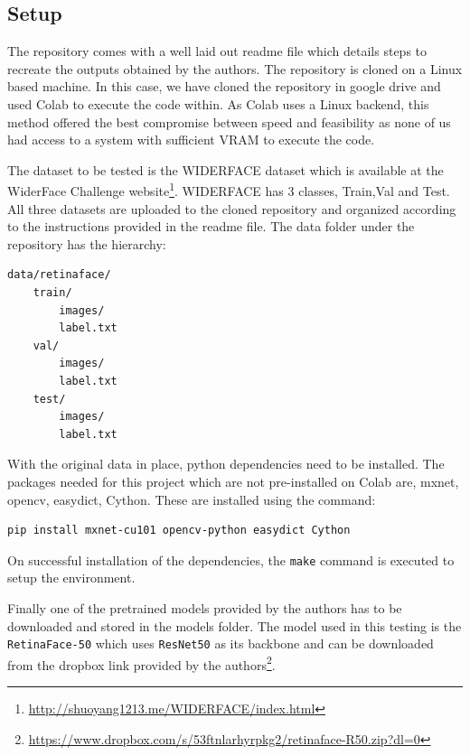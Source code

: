\documentclass{article}
\begin{document}
\subsection{Setup}
The repository comes with a well laid out readme file which details steps to recreate the outputs obtained by the authors. The repository is cloned on a Linux based machine. In this case, we have cloned the repository in google drive and used Colab to execute the code within. As Colab uses a Linux backend, this method offered the best compromise between speed and feasibility as none of us had access to a system with sufficient VRAM to execute the code. 

The dataset to be tested is the WIDERFACE dataset which is available at the WiderFace Challenge website\footnote{\url{http://shuoyang1213.me/WIDERFACE/index.html}}. WIDERFACE has 3 classes, Train,Val and Test. All three datasets are uploaded to the cloned repository and organized according to the instructions provided in the readme file. The data folder under the repository has the hierarchy:
\begin{verbatim}
data/retinaface/
    train/
        images/
        label.txt
    val/
        images/
        label.txt
    test/
        images/
        label.txt
\end{verbatim} 

With the original data in place, python dependencies need to be installed. The packages needed for this project which are not pre-installed on Colab are, mxnet, opencv, easydict, Cython. These are installed using the command: 
\begin{verbatim}
pip install mxnet-cu101 opencv-python easydict Cython
\end{verbatim}

On successful installation of the dependencies, the \texttt{make} command is executed to setup the environment.

Finally one of the pretrained models provided by the authors has to be downloaded and stored in the models folder. The model used in this testing is the \texttt{RetinaFace-50} which uses \texttt{ResNet50} as its backbone and can be downloaded from the dropbox link provided by the authors\footnote{\url{https://www.dropbox.com/s/53ftnlarhyrpkg2/retinaface-R50.zip?dl=0}}.
\end{document}
